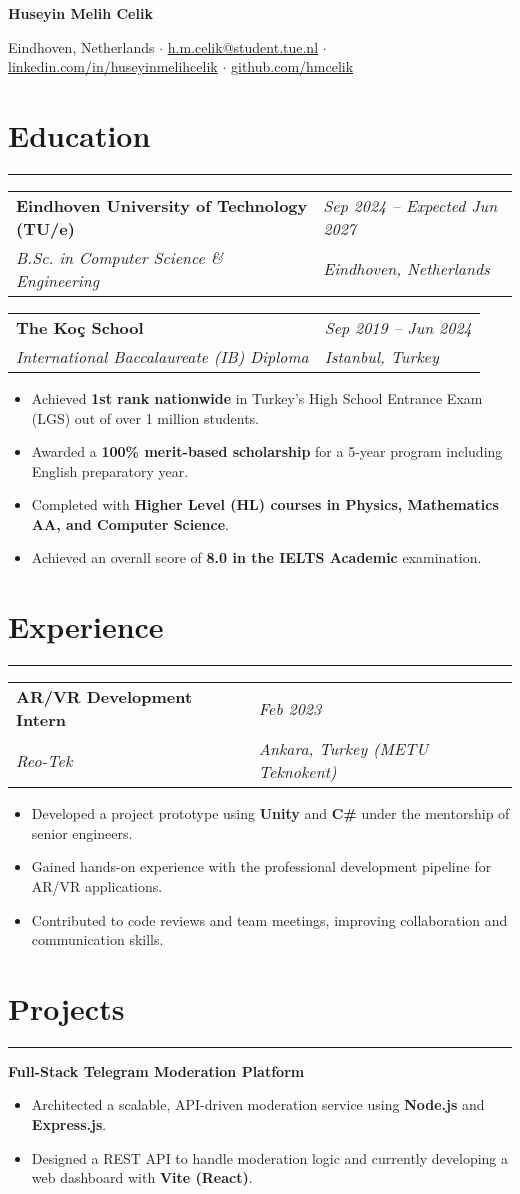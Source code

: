\documentclass[10pt,a4paper]{article}
\makeatletter
\newcommand{\cvname}[1]{\begin{center}\Huge\textbf{#1}\end{center}\vspace{-4mm}}
\newcommand{\cvcontact}[4]{
    \begin{center}
        #1 $\cdot$ \href{mailto:#2}{#2} $\cdot$ \href{https://www.linkedin.com/in/#3}{linkedin.com/in/#3} $\cdot$ \href{https://github.com/#4}{github.com/#4}
    \end{center}
}
\newcommand{\cvsection}[1]{\vspace{6mm}\section*{\large\textbf{#1}}\vspace{-3mm}\hrule\vspace{2mm}}
\newcommand{\cventry}[4]{
    \noindent\begin{tabularx}{\textwidth}{@{}l >{\raggedleft\arraybackslash}X@{}}
        \textbf{#1} & \textit{#2} \\
        \textit{#3} & \textit{#4} \\
    \end{tabularx}
}
\newcommand{\cvproject}[1]{\vspace{3mm}\noindent\textbf{#1}}
\makeatother
\begin{document}
\cvname{Huseyin Melih Celik}
\cvcontact{Eindhoven, Netherlands}{h.m.celik@student.tue.nl}{huseyinmelihcelik}{hmcelik}

\cvsection{Education}
\cventry{Eindhoven University of Technology (TU/e)}{Sep 2024 – Expected Jun 2027}{B.Sc. in Computer Science \& Engineering}{Eindhoven, Netherlands}

\vspace{8mm}

\cventry{The Koç School}{Sep 2019 – Jun 2024}{International Baccalaureate (IB) Diploma}{Istanbul, Turkey}
\begin{itemize} \itemsep -1pt
    \item Achieved \textbf{1st rank nationwide} in Turkey's High School Entrance Exam (LGS) out of over 1 million students.
    \item Awarded a \textbf{100\% merit-based scholarship} for a 5-year program including English preparatory year.
    \item Completed with \textbf{Higher Level (HL) courses in Physics, Mathematics AA, and Computer Science}.
    \item Achieved an overall score of \textbf{8.0 in the IELTS Academic} examination.
\end{itemize}

\cvsection{Experience}
\cventry{AR/VR Development Intern}{Feb 2023}{Reo-Tek}{Ankara, Turkey (METU Teknokent)}
\begin{itemize} \itemsep -1pt
    \item Developed a project prototype using \textbf{Unity} and \textbf{C\#} under the mentorship of senior engineers.
    \item Gained hands-on experience with the professional development pipeline for AR/VR applications.
    \item Contributed to code reviews and team meetings, improving collaboration and communication skills.
\end{itemize}

\cvsection{Projects}
\cvproject{Full-Stack Telegram Moderation Platform}
\begin{itemize} \itemsep -1pt
    \item Architected a scalable, API-driven moderation service using \textbf{Node.js} and \textbf{Express.js}.
    \item Designed a REST API to handle moderation logic and currently developing a web dashboard with \textbf{Vite (React)}.
\end{itemize}
\end{document}
